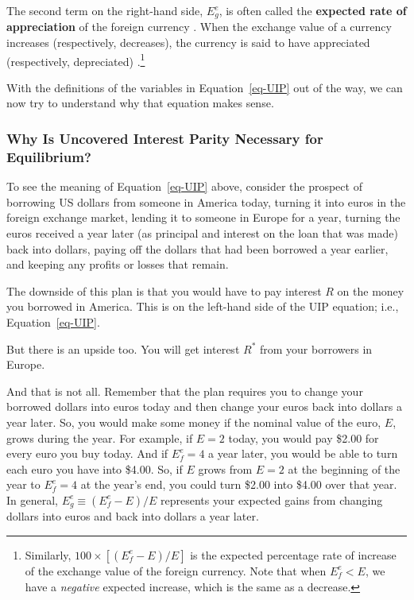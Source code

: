 \documentclass[
  letterpaper,
]{book}
\theoremstyle{plain}
\theoremstyle{remark}
\begin{document}
The second term on the right-hand side, \(E_g^e\), is often called the
\textbf{expected rate of appreciation} of the foreign currency
. When the exchange value of a
currency increases (respectively, decreases), the currency is said to
have appreciated (respectively, depreciated)
.\footnote{Similarly,
  \(100\times[(E^e_f-E)/E]\) is the expected percentage rate of increase
  of the exchange value of the foreign currency. Note that when
  \(E^e_f<E\), we have a \emph{negative} expected increase, which is the
  same as a decrease.}

With the definitions of the variables in Equation~\ref{eq-UIP} out of
the way, we can now try to understand why that equation makes sense.

\subsubsection{Why Is Uncovered Interest Parity Necessary for
Equilibrium?}\label{sec-summary-UIP}

To see the meaning of Equation~\ref{eq-UIP} above, consider the prospect
of borrowing US dollars from someone in America today, turning it into
euros in the foreign exchange market, lending it to someone in Europe
for a year, turning the euros received a year later (as principal and
interest on the loan that was made) back into dollars, paying off the
dollars that had been borrowed a year earlier, and keeping any profits
or losses that remain.

The downside of this plan is that you would have to pay interest \(R\)
on the money you borrowed in America. This is on the left-hand side of
the UIP equation; i.e., Equation~\ref{eq-UIP}.

But there is an upside too. You will get interest \(R^*\) from your
borrowers in Europe.

And that is not all. Remember that the plan requires you to change your
borrowed dollars into euros today and then change your euros back into
dollars a year later. So, you would make some money if the nominal value
of the euro, \(E\), grows during the year. For example, if \(E = 2\)
today, you would pay \$2.00 for every euro you buy today. And if
\(E_f^e = 4\) a year later, you would be able to turn each euro you have
into \$4.00. So, if \(E\) grows from \(E = 2\) at the beginning of the
year to \(E^e_f = 4\) at the year's end, you could turn \$2.00 into
\$4.00 over that year. In general, \(E^e_g\equiv(E^e_f-E)/E\) represents
your expected gains from changing dollars into euros and back into
dollars a year later.
\end{document}
